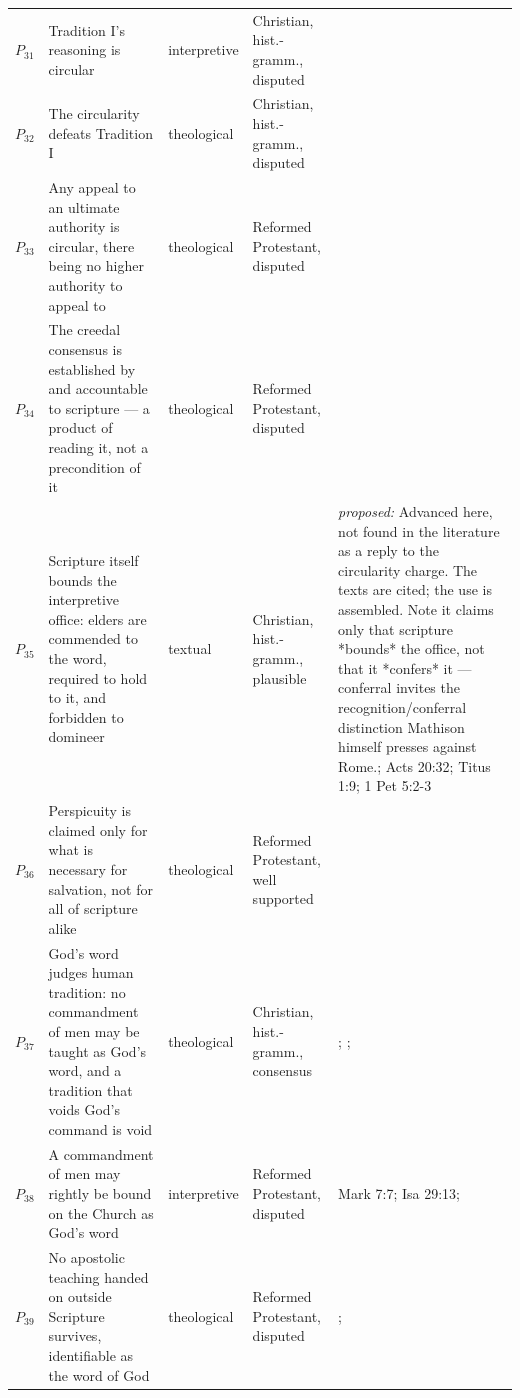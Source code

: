 \documentclass[11pt]{article}
\begin{document}
\begin{longtable}{@{}r >{\raggedright\arraybackslash}p{} l >{\raggedright\arraybackslash}p{} >{\raggedright\arraybackslash}p{}@{}}
$P_{31}$ & Tradition I's reasoning is circular & interpretive & Christian, hist.-gramm., disputed & \cite[122–123]{geisler-review-mathison-2005} \\
$P_{32}$ & The circularity defeats Tradition I & theological & Christian, hist.-gramm., disputed & \cite[123]{geisler-review-mathison-2005} \\
$P_{33}$ & Any appeal to an ultimate authority is circular, there being no higher authority to appeal to & theological & Reformed Protestant, disputed & \cite[ch. 11]{barrett-gods-word-alone-2016} \\
$P_{34}$ & The creedal consensus is established by and accountable to scripture — a product of reading it, not a precondition of it & theological & Reformed Protestant, disputed & \cite[ch. 3]{allen-swain-reformed-catholicity-2015} \\
$P_{35}$ & Scripture itself bounds the interpretive office: elders are commended to the word, required to hold to it, and forbidden to domineer & textual & Christian, hist.-gramm., plausible & \emph{proposed:} Advanced here, not found in the literature as a reply to the circularity charge. The texts are cited; the use is assembled. Note it claims only that scripture *bounds* the office, not that it *confers* it — conferral invites the recognition/conferral distinction Mathison himself presses against Rome.; Acts 20:32; Titus 1:9; 1 Pet 5:2-3 \\
$P_{36}$ & Perspicuity is claimed only for what is necessary for salvation, not for all of scripture alike & theological & Reformed Protestant, well supported & \cite[I.7]{westminster-confession-1647} \\
$P_{37}$ & God's word judges human tradition: no commandment of men may be taught as God's word, and a tradition that voids God's command is void & theological & Christian, hist.-gramm., consensus & \cite[Vatican II (1965), Dei Verbum 10]{tanner-decrees-1990}; \cite[IV.x.23]{calvin-institutes-1960}; \cite{florovsky-bible-church-tradition-1972} \\
$P_{38}$ & A commandment of men may rightly be bound on the Church as God's word & interpretive & Reformed Protestant, disputed & Mark 7:7; Isa 29:13; \cite[IV.x.23]{calvin-institutes-1960} \\
$P_{39}$ & No apostolic teaching handed on outside Scripture survives, identifiable as the word of God & theological & Reformed Protestant, disputed & \cite[506]{whitaker-disputation-1849}; \cite[I.6]{westminster-confession-1647} \\
\bottomrule
\end{longtable}
\end{document}
